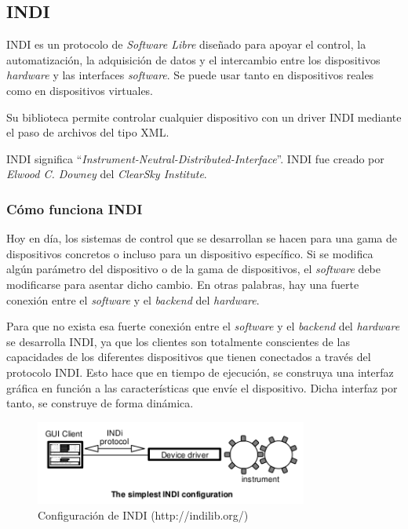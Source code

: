 \subsection{INDI}
INDI es un protocolo de \textit{Software Libre} diseñado para apoyar el control, la automatización, la adquisición de datos y el intercambio entre los dispositivos \textit{hardware} y las interfaces \textit{software}. Se puede usar tanto en dispositivos reales como en dispositivos virtuales.

Su biblioteca permite controlar cualquier dispositivo con un driver INDI mediante el paso de archivos del tipo XML.

INDI significa “\textit{Instrument-Neutral-Distributed-Interface}”. INDI fue creado por \textit{Elwood C. Downey} del \textit{ClearSky Institute}\cite{INDI}.

\subsubsection{Cómo funciona INDI}
Hoy en día, los sistemas de control que se desarrollan se hacen para una gama de dispositivos concretos o incluso para un dispositivo específico. Si se modifica algún parámetro del dispositivo o de la gama de dispositivos, el \textit{software} debe modificarse para asentar dicho cambio. En otras palabras, hay una fuerte conexión entre el \textit{software} y el \textit{backend} del \textit{hardware}.

Para que no exista esa fuerte conexión entre el \textit{software} y el \textit{backend} del \textit{hardware} se desarrolla INDI,  ya que los clientes son totalmente conscientes de las capacidades de los diferentes dispositivos que tienen conectados a través del protocolo INDI. Esto hace que en tiempo de ejecución, se construya una interfaz gráfica en función a las características que envíe el dispositivo. Dicha interfaz por tanto, se construye de forma dinámica.

\begin{figure}[htb]
\centering
\includegraphics[width=0.8\textwidth]{./imagenes/funcionINDI}
\caption{Configuración de INDI (http://indilib.org/)} \label{fig:funcionINDI}
\end{figure}

